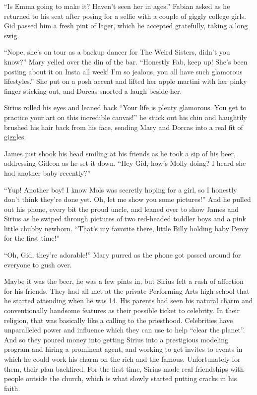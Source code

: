 \documentclass[12pt,twoside,openright]{memoir}
\begin{document}
``Is Emma going to make it? Haven't seen her in ages.'' Fabian asked as he returned to his seat after posing for a selfie with a couple of giggly college girls. Gid passed him a fresh pint of lager, which he accepted gratefully, taking a long swig. 

``Nope, she's on tour as a backup dancer for The Weird Sisters, didn't you know?'' Mary yelled over the din of the bar.
``Honestly Fab, keep up! She's been posting about it on Insta all week! I'm so jealous, you all have such glamorous lifestyles.'' She put on a posh accent and lifted her apple martini with her pinky finger sticking out, and Dorcas snorted a laugh beside her. 

Sirius rolled his eyes and leaned back ``Your life is plenty glamorous. You get to practice your art on this incredible canvas!'' he stuck out his chin and haughtily brushed his hair back from his face, sending Mary and Dorcas into a real fit of giggles. 

James just shook his head smiling at his friends as he took a sip of his beer, addressing Gideon as he set it down. ``Hey Gid, how's Molly doing? I heard she had another baby recently?'' 

``Yup! Another boy! I know Mols was secretly hoping for a girl, so I honestly don't think they're done yet. Oh, let me show you some pictures!'' And he pulled out his phone, every bit the proud uncle, and leaned over to show James and Sirius as he swiped through pictures of two red-headed toddler boys and a pink little chubby newborn. ``That's my favorite there, little Billy holding baby Percy for the first time!'' 

``Oh, Gid, they're adorable!'' Mary purred as the phone got passed around for everyone to gush over. 

Maybe it was the beer, he was a few pints in, but Sirius felt a rush of affection for his friends. They had all met at the private Performing Arts high school that he started attending when he was 14. His parents had seen his natural charm and conventionally handsome features as their possible ticket to celebrity. In their religion, that was basically like a calling to the priesthood. Celebrities have unparalleled power and influence which they can use to help ``clear the planet''. And so they poured money into getting Sirius into a prestigious modeling program and hiring a prominent agent, and working to get invites to events in which he could work his charm on the rich and the famous. Unfortunately for them, their plan backfired. For the first time, Sirius made real friendships with people outside the church, which is what slowly started putting cracks in his faith. 
\end{document}

